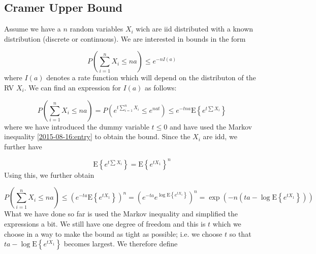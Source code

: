

\subsection{Cramer Upper Bound}

Assume we have a $n$ random variables $X_i$ wich are iid distributed with a known distribution (discrete or continuous). We are interested in bounds in the form

\begin{equation*}
P\left(\sum_{i=1}^n X_i \leq na \right) \leq e^{-nI(a)}
\end{equation*}
%
where $I(a)$ denotes a rate function which will depend on the distributon of the RV $X_i$. We can find an expression for $I(a)$ as follows:

\begin{equation*}
P\left(\sum_{i=1}^n X_i \leq na \right) = P\left(e^{t \sum_{i=1}^n X_i} \leq e^{nat} \right) \leq e^{-tna} \mathrm{E}\left\{ e^{t \sum X_i} \right\}
\end{equation*}
%
where we have introduced the dummy variable $t \leq 0$ and have used the Markov inequality \ref{2015-08-16:entry} to obtain the bound. Since the $X_i$ are idd, we further have

\begin{equation*}
\mathrm{E}\left\{ e^{t \sum X_i} \right\} = \mathrm{E}\left\{ e^{t X_1} \right\}^n
\end{equation*}
%
Using this, we further obtain

\begin{equation*}
P\left(\sum_{i=1}^n X_i \leq na \right) \leq \left( e^{-ta} \mathrm{E}\left\{ e^{t X_1} \right\} \right)^n = \left( e^{-ta} e^ {\log \mathrm{E}\left\{ e^{t X_1} \right\}} \right)^n = \exp \left( -n \left( ta - \log \mathrm{E}\left\{ e^{t X_1} \right\} \right) \right)
\end{equation*}
%
What we have done so far is used the Markov inequality and simplified the expressions a bit. We still have one degree of freedom and this is $t$ which we choose in a way to make the bound as tight as possible; i.e. we choose $t$ so that $ta - \log \mathrm{E}\left\{ e^{t X_1}\right\}$ becomes largest. We therefore define

